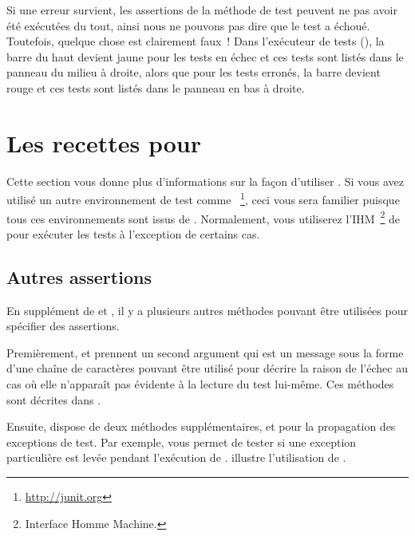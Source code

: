 \documentclass[a4paper,10pt,twoside]{book}
\begin{document}
Si une erreur survient, les assertions de la méthode de test peuvent ne pas 
avoir été exécutées du tout, ainsi nous ne pouvons pas dire que le test a échoué. 
Toutefois, quelque chose est clairement faux~!
Dans l'exécuteur de tests (), la barre du haut devient jaune pour les 
tests en échec et ces tests sont listés dans le panneau du milieu à droite, alors que 
pour les tests erronés, la barre devient rouge et ces tests sont listés dans le panneau 
en bas à droite.


\section{Les recettes pour \SUnit}
Cette section vous donne plus d'informations sur la façon d'utiliser \SUnit. Si vous avez 
utilisé un autre environnement de test comme \JUnit~\footnote{\url{http://junit.org}}, ceci 
vous sera familier puisque tous ces environnements sont issus de  \SUnit. 
Normalement, vous utiliserez l'IHM~\footnote{Interface Homme Machine.} de \SUnit pour exécuter 
les tests à l'exception de certains cas.


\subsection{Autres assertions}
En supplément de  et , il y a plusieurs autres méthodes pouvant être utilisées 
pour spécifier des assertions. 


Premièrement,  et  
prennent un second argument qui est un message sous la forme d'une chaîne de caractères pouvant 
être utilisé pour décrire la raison de l'échec au cas où elle n'apparaît pas évidente à la 
lecture du test lui-même. Ces méthodes sont décrites dans .


Ensuite, \sunit dispose de deux méthodes supplémentaires,  
et   pour la propagation des exceptions de test. 
Par exemple,  vous permet de tester si une 
exception particulière est levée pendant l'exécution de .  
illustre l'utilisation de \mbox{}.
\end{document}
